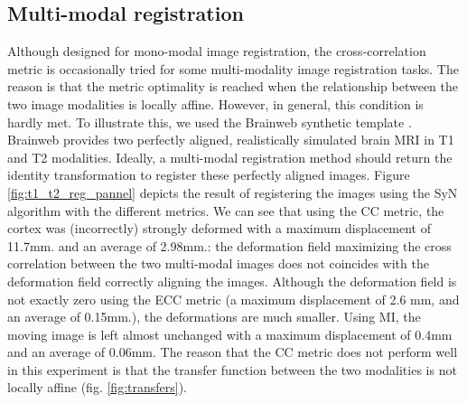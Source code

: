 

\subsection{Multi-modal registration}
Although designed for mono-modal image registration, the cross-correlation metric is occasionally tried for some multi-modality image registration tasks. The reason is that the
metric optimality is reached when the relationship between the two image modalities is locally affine. However, in general, this condition is hardly met. To illustrate this,
we used the Brainweb synthetic template \cite{Cocosco1997}\cite{Kwan1999}. Brainweb provides two perfectly aligned, realistically simulated brain MRI in T1 and T2 modalities.
Ideally, a multi-modal registration method should return the identity transformation to register these perfectly aligned images.
Figure \ref{fig:t1_t2_reg_pannel} depicts the result of registering the images using the SyN algorithm with the different metrics. We can see that using the CC metric,
the cortex was (incorrectly) strongly deformed with a maximum displacement of 11.7mm. and an average of 2.98mm.: the deformation field maximizing the cross correlation between the two multi-modal images does not coincides with the deformation field
correctly aligning the images. Although the deformation field is not exactly zero using the ECC metric (a maximum displacement of 2.6 mm, and an average of 0.15mm.), the deformations
are much smaller. Using MI, the moving image is left almost unchanged with a maximum displacement of 0.4mm and an average of 0.06mm. The reason that the CC metric does not perform well
in this experiment is that the transfer function between the two modalities is not locally affine (fig. \ref{fig:transfers}).

